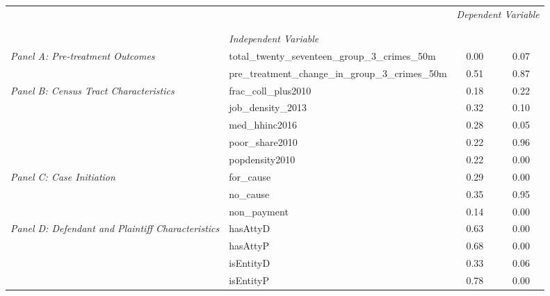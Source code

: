 \begin{tabular}{llcc}
\toprule
 &  & \multicolumn{2}{c}{\textit{Dependent Variable}} \\
\cline{3-4}
\\
 &  &  &  \\
 & \emph{Independent Variable} &  &  \\
\midrule
\multirow[c]{2}{3cm}{\textit{Panel A: Pre-treatment Outcomes}} & total_twenty_seventeen_group_3_crimes_50m & 0.00 & 0.07 \\
 & pre_treatment_change_in_group_3_crimes_50m & 0.51 & 0.87 \\
\cline{1-4}
\multirow[c]{5}{3cm}{\textit{Panel B: Census Tract Characteristics}} & frac_coll_plus2010 & 0.18 & 0.22 \\
 & job_density_2013 & 0.32 & 0.10 \\
 & med_hhinc2016 & 0.28 & 0.05 \\
 & poor_share2010 & 0.22 & 0.96 \\
 & popdensity2010 & 0.22 & 0.00 \\
\cline{1-4}
\multirow[c]{3}{3cm}{\textit{Panel C: Case Initiation}} & for_cause & 0.29 & 0.00 \\
 & no_cause & 0.35 & 0.95 \\
 & non_payment & 0.14 & 0.00 \\
\cline{1-4}
\multirow[c]{4}{3cm}{\textit{Panel D: Defendant and Plaintiff Characteristics}} & hasAttyD & 0.63 & 0.00 \\
 & hasAttyP & 0.68 & 0.00 \\
 & isEntityD & 0.33 & 0.06 \\
 & isEntityP & 0.78 & 0.00 \\
\cline{1-4}
\bottomrule
\end{tabular}
